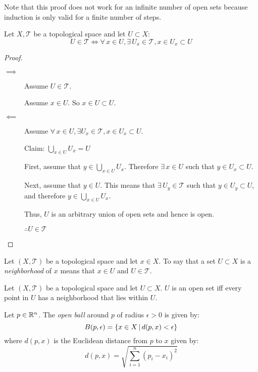 \documentclass[letterpaper,12pt,fleqn]{article}
\newcommand{\T}{\mathscr{T}}
\newcommand{\e}{\epsilon}
\begin{document}
Note that this proof does not work for an infinite number of open sets because induction is only valid for a finite
number of steps.

\begin{theorem}
  Let \(X,\T\) be a topological space and let \(U\subset X\):
  \[U\in\T\iff\forall\,x\in U,\exists\,U_x\in\T,x\in U_x\subset U\]
\end{theorem}

\begin{proof}
  \begin{description}
  \item[]

  \item[\(\implies\)] Assume \(U\in\T\).

    Assume \(x\in U\).  So \(x\in U\subset U\).

  \item[\(\impliedby\)] Assume \(\forall\,x\in U,\exists U_x\in\T,x\in U_x\subset U\).

    Claim: \(\bigcup_{x\in U}U_x=U\)

    First, assume that \(y\in \bigcup_{x\in U}U_x\).  Therefore \(\exists\,x\in U\) such that \(y\in U_x\subset U\).

    Next, assume that \(y\in U\).  This means that \(\exists\,U_y\in\T\) such that \(y\in U_y\subset U\), and
    therefore \(y\in\bigcup_{x\in U}U_x\).

    Thus, \(U\) is an arbitrary union of open sets and hence is open.

    \(\therefore U\in\T\)
  \end{description}
\end{proof}

\begin{definition}
  Let \((X,\T)\) be a topological space and let \(x\in X\).  To say that a set \(U\subset X\) is a \emph{neighborhood}
  of \(x\) means that \(x\in U\) and \(U\in\T\).
\end{definition}

\begin{corollary}
  Let \((X,\T)\) be a topological space and let \(U\subset X\).  \(U\) is an open set iff every point in \(U\) has
  a neighborhood that lies within \(U\).
\end{corollary}

\begin{definition}
  Let \(p\in\mathbb{R}^n\).  The \emph{open ball} around \(p\) of radius \(\e>0\) is given by:
  \[B(p,\e)=\setb{x\in X}{d(p,x)<\e}\]
  where \(d(p,x)\) is the Euclidean distance from \(p\) to \(x\) given by:
  \[d(p,x)=\sqrt{\sum_{i=1}^n(p_i-x_i)^2}\]
\end{definition}
\end{document}
